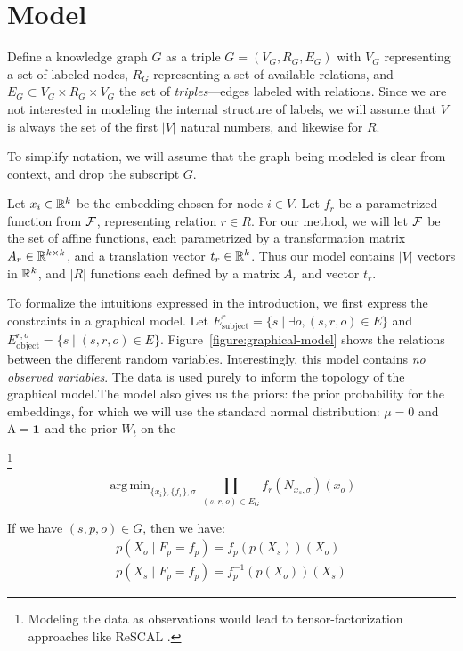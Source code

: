 \documentclass[11pt]{article}
\DeclareMathOperator*{\argmin}{arg\,min}
\begin{document}
\section{Model}
\label{section:model}

Define a knowledge graph $G$ as a triple $G = (V_G, R_G, E_G)$ with $V_G$ representing a set of labeled nodes, $R_G$ representing a set of available relations, and $E_G \subset V_G \times R_G \times V_G$ the set of \emph{triples}---edges labeled with relations. Since we are not interested in modeling the internal structure of labels, we will assume that $V$ is always the set of the first $|V|$ natural numbers, and likewise for $R$.

To simplify notation, we will assume that the graph being modeled is clear from context, and drop the subscript $G$.

Let $x_i \in {\mathbb R}^k$ be the embedding chosen for node $i \in V$. Let $f_r$ be a parametrized function from $\cal F$, representing relation $r \in R$. For our method, we will let $\cal F$ be the set of affine functions, each parametrized by a transformation matrix $A_r \in {\mathbb R}^{k\times k}$, and a translation vector $t_r\in {\mathbb R}^k$. Thus our model contains $|V|$ vectors in ${\mathbb R}^k$, and $|R|$ functions each defined by a matrix $A_r$ and vector $t_r$.

To formalize the intuitions expressed in the introduction, we first express the constraints in a graphical model. Let $E^r_\text{subject} = \{s \mid \exists o, (s, r, o) \in E\}$ and $E^{r, o}_\text{object} = \{ s \mid (s, r, o) \in E\}$. Figure~\ref{figure:graphical-model} shows the relations between the different random variables. Interestingly, this model contains \emph{no observed variables}. The data is used purely to inform the topology of the graphical model.\footnotemark The model also gives us the priors: the prior probability for the embeddings, for which we will use the standard normal distribution: $\mu = 0$ and $\Lambda = \bf{1}$ and the prior $W_t$ on the

\footnote{Modeling the data as observations would lead to tensor-factorization approaches like ReSCAL \cite{}.}



\[
\argmin_{\{x_i\}, \{f_r\}, \sigma} \prod_{(s,r,o) \in E_G} f_r(N_{x_s,\sigma})(x_o)
\]

If we have $(s, p, o) \in G$, then we have:
\begin{align*}
p(X_o \mid F_p = f_p) = f_p(p(X_s))(X_o) \\
p(X_s \mid F_p = f_p) = f_p^{-1}(p(X_o))(X_s) 
\end{align*}
\end{document}

